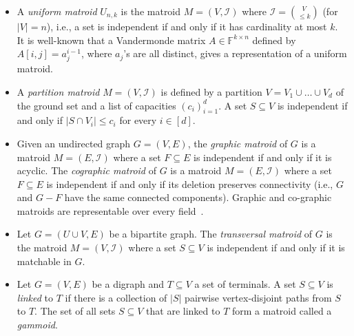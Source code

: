 \documentclass{theoretics}
\newcommand{\cI}{\ensuremath{\mathcal I}\xspace}
\begin{document}
\begin{itemize}
\item A \emph{uniform matroid} $U_{n,k}$ is the matroid $M=(V,\cI)$
  where $\cI=\binom{V}{\leq k}$ (for $|V|=n$), i.e., a set is
  independent if and only if it has cardinality at most $k$.
  It is well-known that a Vandermonde matrix $A \in \mathbb{F}^{k \times n}$ defined by $A[i,j] = a_j^{i-1}$, where $a_j$'s are all distinct, gives a representation of a uniform matroid.

\item A \emph{partition matroid} $M=(V,\cI)$ is defined by a partition
  $V=V_1 \cup \ldots \cup V_d$ of the ground set and a list of
  capacities $(c_i)_{i=1}^d$. A set $S \subseteq V$ is independent if
  and only if $|S \cap V_i| \leq c_i$ for every $i \in [d]$.

\item Given an undirected graph $G=(V,E)$, the \emph{graphic matroid}
  of $G$ is a matroid $M=(E,\cI)$ where a set $F \subseteq E$ is
  independent if and only if it is acyclic. The \emph{cographic matroid}
  of $G$ is a matroid $M=(E,\cI)$ where a set $F \subseteq E$ is
  independent if and only if its deletion preserves connectivity (i.e., $G$ and
  $G-F$ have the same connected components). Graphic and co-graphic matroids
  are representable over every field~\cite{OxleyBook}.
  
\item Let $G=(U \cup V,E)$ be a bipartite graph. The \emph{transversal
    matroid} of $G$ is the matroid $M=(V,\cI)$ where a set
  $S \subseteq V$ is independent if and only if it is matchable in
  $G$.
\item Let $G=(V,E)$ be a digraph and $T \subseteq V$ a set of
  terminals. A set $S \subseteq V$ is \emph{linked} to $T$ if there is
  a collection of $|S|$ pairwise vertex-disjoint paths from $S$ to $T$.
  The set of all sets $S \subseteq V$ that are linked to $T$ form a
  matroid called a \emph{gammoid}.
\end{itemize}
\end{document}
